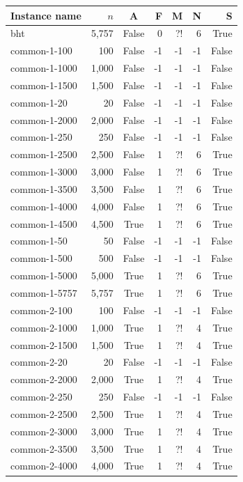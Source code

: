 
\begin{table}[ht]
\centering
\begin{tabular}{l r c r r r r}
\hline
Instance name & $n$ & A & F & M & N & S \\
\hline
bht & 5,757 & False & 0 & ?! & 6 & True \\
common-1-100 & 100 & False & -1 & -1 & -1 & False \\
common-1-1000 & 1,000 & False & -1 & -1 & -1 & False \\
common-1-1500 & 1,500 & False & -1 & -1 & -1 & False \\
common-1-20 & 20 & False & -1 & -1 & -1 & False \\
common-1-2000 & 2,000 & False & -1 & -1 & -1 & False \\
common-1-250 & 250 & False & -1 & -1 & -1 & False \\
common-1-2500 & 2,500 & False & 1 & ?! & 6 & True \\
common-1-3000 & 3,000 & False & 1 & ?! & 6 & True \\
common-1-3500 & 3,500 & False & 1 & ?! & 6 & True \\
common-1-4000 & 4,000 & False & 1 & ?! & 6 & True \\
common-1-4500 & 4,500 & True & 1 & ?! & 6 & True \\
common-1-50 & 50 & False & -1 & -1 & -1 & False \\
common-1-500 & 500 & False & -1 & -1 & -1 & False \\
common-1-5000 & 5,000 & True & 1 & ?! & 6 & True \\
common-1-5757 & 5,757 & True & 1 & ?! & 6 & True \\
common-2-100 & 100 & False & -1 & -1 & -1 & False \\
common-2-1000 & 1,000 & True & 1 & ?! & 4 & True \\
common-2-1500 & 1,500 & True & 1 & ?! & 4 & True \\
common-2-20 & 20 & False & -1 & -1 & -1 & False \\
common-2-2000 & 2,000 & True & 1 & ?! & 4 & True \\
common-2-250 & 250 & False & -1 & -1 & -1 & False \\
common-2-2500 & 2,500 & True & 1 & ?! & 4 & True \\
common-2-3000 & 3,000 & True & 1 & ?! & 4 & True \\
common-2-3500 & 3,500 & True & 1 & ?! & 4 & True \\
common-2-4000 & 4,000 & True & 1 & ?! & 4 & True \\

\end{tabular}
\end{table}

